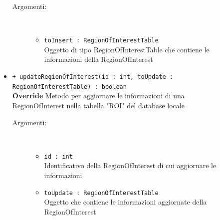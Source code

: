 \documentclass[../DefinizioneDiProdotto.tex]{subfiles}
\begin{document}
\begin{description}
\begin{itemize}
\begin{description}
			\item[Argomenti:] \
			\begin{itemize}
				\item \texttt{toInsert : RegionOfInterestTable}\\
				Oggetto di tipo RegionOfInterestTable che contiene le informazioni della RegionOfInterest\end{itemize}
		\end{description}
		\item \texttt{+ updateRegionOfInterest(id : int, toUpdate : RegionOfInterestTable) : boolean}\\
		\textbf{Override} Metodo per aggiornare le informazioni di una RegionOfInterest nella tabella "ROI" del database locale
		\begin{description}
			\item[Argomenti:] \
			\begin{itemize}
				\item \texttt{id : int}\\
				Identificativo della RegionOfInterest di cui aggiornare le informazioni\item \texttt{toUpdate : RegionOfInterestTable}\\
				Oggetto che contiene le informazioni aggiornate della RegionOfInterest\end{itemize}
		\end{description}
	\end{itemize}
\end{description}
\end{document}
